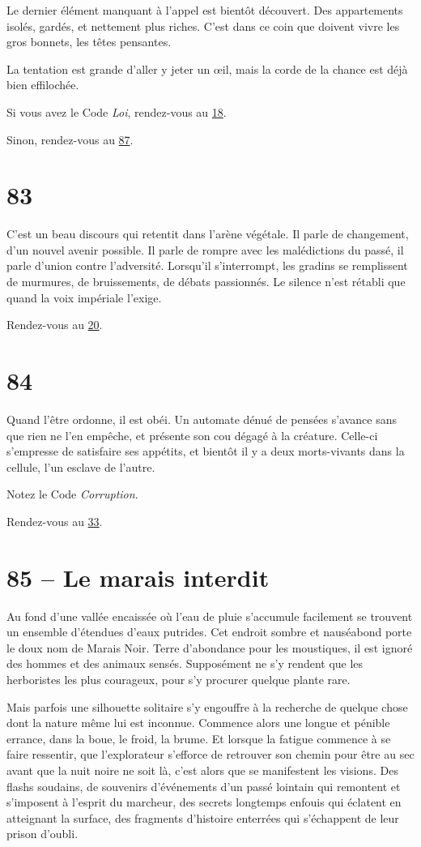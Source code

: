 \documentclass{report}
\newcommand{\gsection}[1]{
    \section{#1}
    \label{section-#1}
}
\newcommand{\glink}[1]{\hyperref[section-#1]{#1}}
\begin{document}
Le dernier élément manquant à l'appel est bientôt découvert. Des appartements isolés, gardés, et nettement plus riches. C'est dans ce coin que doivent vivre les gros bonnets, les têtes pensantes.

La tentation est grande d'aller y jeter un œil, mais la corde de la chance est déjà bien effilochée. 

Si vous avez le Code \emph{Loi}, rendez-vous au \glink{18}.

Sinon, rendez-vous au \glink{87}.

\gsection{83}

C'est un beau discours qui retentit dans l'arène végétale. Il parle de changement, d'un nouvel avenir possible. Il parle de rompre avec les malédictions du passé, il parle d'union contre l'adversité. Lorsqu'il s'interrompt, les gradins se remplissent de murmures, de bruissements, de débats passionnés. Le silence n'est rétabli que quand la voix impériale l'exige.

Rendez-vous au \glink{20}.

\gsection{84}

Quand l'être ordonne, il est obéi. Un automate dénué de pensées s'avance sans que rien ne l'en empêche, et présente son cou dégagé à la créature. Celle-ci s'empresse de satisfaire ses appétits, et bientôt il y a deux morts-vivants dans la cellule, l'un esclave de l'autre.

Notez le Code \emph{Corruption}.

Rendez-vous au \glink{33}.

\gsection{85 – Le marais interdit}

Au fond d'une vallée encaissée où l'eau de pluie s'accumule facilement se trouvent un ensemble d'étendues d'eaux putrides. Cet endroit sombre et nauséabond porte le doux nom de Marais Noir. Terre d'abondance pour les moustiques, il est ignoré des hommes et des animaux sensés. Supposément ne s'y rendent que les herboristes les plus courageux, pour s'y procurer quelque plante rare.

Mais parfois une silhouette solitaire s'y engouffre à la recherche de quelque chose dont la nature même lui est inconnue. Commence alors une longue et pénible errance, dans la boue, le froid, la brume. Et lorsque la fatigue commence à se faire ressentir, que l'explorateur s'efforce de retrouver son chemin pour être au sec avant que la nuit noire ne soit là, c'est alors que se manifestent les visions. Des flashs soudains, de souvenirs d'événements d'un passé lointain qui remontent et s'imposent à l'esprit du marcheur, des secrets longtemps enfouis qui éclatent en atteignant la surface, des fragments d'histoire enterrées qui s'échappent de leur prison d'oubli.
\end{document}
